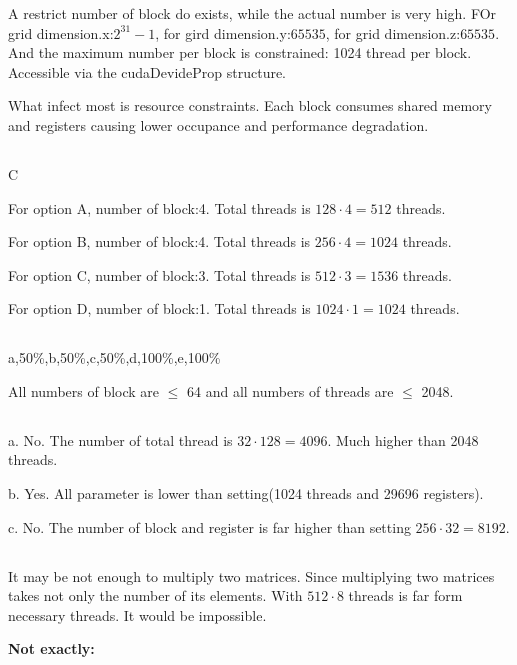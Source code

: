 \documentclass{article}
\begin{document}
A restrict number of block do exists, while the actual number is very high. FOr grid dimension.x:$2^{31}-1$, for gird dimension.y:$65535$, for grid dimension.z:$65535$. And the maximum number per block is constrained: 1024 thread per block. Accessible via the cudaDevideProp structure.

What infect most is resource constraints. Each block consumes shared memory and registers causing lower occupance and performance degradation.


\subsection{}
C

For option A, number of block:4. Total threads is \(128\cdot4=512\) threads.

For option B, number of block:4. Total threads is \(256\cdot4=1024\) threads.

For option C, number of block:3. Total threads is \(512\cdot3=1536\) threads.

For option D, number of block:1. Total threads is \(1024\cdot1=1024\) threads.

\subsection{}
a,50\%,b,50\%,c,50\%,d,100\%,e,100\%

All numbers of block are $\leq$ 64 and all numbers of threads are $\leq$ 2048.

\subsection{}
a. No. The number of total thread is \(32\cdot128 = 4096\). Much higher than 2048 threads.

b. Yes. All parameter is lower than setting(1024 threads and 29696 registers).

c. No. The number of block and register is far higher than setting \(256\cdot32=8192\).

\subsection{}
It may be not enough to multiply two matrices. Since multiplying two matrices takes not only the number of its elements. With \(512\cdot8\) threads is far form necessary threads. It would be impossible.

\textbf{Not exactly:}
\end{document}
